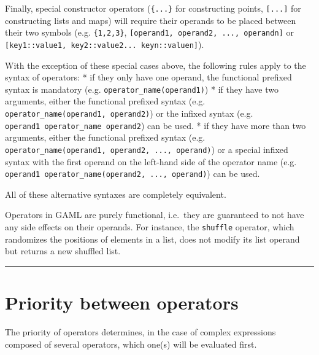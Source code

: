 \documentclass[]{book}
\theoremstyle{definition}
\theoremstyle{definition}
\theoremstyle{definition}
\theoremstyle{remark}
\begin{document}
Finally, special constructor operators (\texttt{\{...\}} for
constructing points, \texttt{{[}...{]}} for constructing lists and maps)
will require their operands to be placed between their two symbols (e.g.
\texttt{\{1,2,3\}}, \texttt{{[}operand1,\ operand2,\ ...,\ operandn{]}}
or \texttt{{[}key1::value1,\ key2::value2...\ keyn::valuen{]}}).

With the exception of these special cases above, the following rules
apply to the syntax of operators: * if they only have one operand, the
functional prefixed syntax is mandatory (e.g.
\texttt{operator\_name(operand1)}) * if they have two arguments, either
the functional prefixed syntax (e.g.
\texttt{operator\_name(operand1,\ operand2)}) or the infixed syntax
(e.g. \texttt{operand1\ operator\_name\ operand2}) can be used. * if
they have more than two arguments, either the functional prefixed syntax
(e.g. \texttt{operator\_name(operand1,\ operand2,\ ...,\ operand)}) or a
special infixed syntax with the first operand on the left-hand side of
the operator name (e.g.
\texttt{operand1\ operator\_name(operand2,\ ...,\ operand)}) can be
used.

All of these alternative syntaxes are completely equivalent.

Operators in GAML are purely functional, i.e.~they are guaranteed to not
have any side effects on their operands. For instance, the
\texttt{shuffle} operator, which randomizes the positions of elements in
a list, does not modify its list operand but returns a new shuffled
list.

\begin{center}\rule{0.5\linewidth}{\linethickness}\end{center}

\section{Priority between operators}\label{priority-between-operators-2}

The priority of operators determines, in the case of complex expressions
composed of several operators, which one(s) will be evaluated first.
\end{document}
